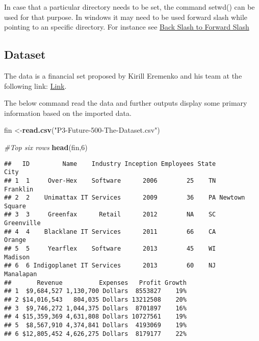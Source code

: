 \documentclass[]{article}
\newenvironment{Shaded}{\begin{snugshade}}{\end{snugshade}}
\newcommand{\CommentTok}[1]{\textcolor[rgb]{0.56,0.35,0.01}{\textit{#1}}}
\newcommand{\DecValTok}[1]{\textcolor[rgb]{0.00,0.00,0.81}{#1}}
\newcommand{\KeywordTok}[1]{\textcolor[rgb]{0.13,0.29,0.53}{\textbf{#1}}}
\newcommand{\NormalTok}[1]{#1}
\newcommand{\StringTok}[1]{\textcolor[rgb]{0.31,0.60,0.02}{#1}}
\begin{document}
In case that a particular directory needs to be set, the command setwd()
can be used for that purpose. In windows it may need to be used forward
slash while pointing to an specific directory. For instance see
\href{https://stackoverflow.com/questions/17605563/efficiently-convert-backslash-to-forward-slash-in-r}{Back
Slash to Forward Slash}

\hypertarget{dataset}{%
\subsection{Dataset}\label{dataset}}

The data is a financial set proposed by Kirill Eremenko and his team at
the following link:
\href{https://www.superdatascience.com/pages/rcourse-advanced}{Link}.

The below command read the data and further outputs display some primary
information based on the imported data.

\begin{Shaded}
\begin{Highlighting}[]
\NormalTok{fin <-}\KeywordTok{read.csv}\NormalTok{(}\StringTok{"P3-Future-500-The-Dataset.csv"}\NormalTok{)}
\end{Highlighting}
\end{Shaded}

\begin{Shaded}
\begin{Highlighting}[]
\CommentTok{#Top six rows}
\KeywordTok{head}\NormalTok{(fin,}\DecValTok{6}\NormalTok{)}
\end{Highlighting}
\end{Shaded}

\begin{verbatim}
##   ID         Name    Industry Inception Employees State           City
## 1  1     Over-Hex    Software      2006        25    TN       Franklin
## 2  2    Unimattax IT Services      2009        36    PA Newtown Square
## 3  3     Greenfax      Retail      2012        NA    SC     Greenville
## 4  4    Blacklane IT Services      2011        66    CA         Orange
## 5  5     Yearflex    Software      2013        45    WI        Madison
## 6  6 Indigoplanet IT Services      2013        60    NJ      Manalapan
##       Revenue          Expenses   Profit Growth
## 1  $9,684,527 1,130,700 Dollars  8553827    19%
## 2 $14,016,543   804,035 Dollars 13212508    20%
## 3  $9,746,272 1,044,375 Dollars  8701897    16%
## 4 $15,359,369 4,631,808 Dollars 10727561    19%
## 5  $8,567,910 4,374,841 Dollars  4193069    19%
## 6 $12,805,452 4,626,275 Dollars  8179177    22%
\end{verbatim}
\end{document}
